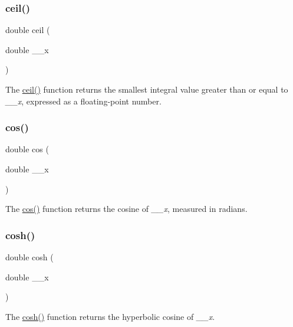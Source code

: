 \subsubsection{\texorpdfstring{ceil()}{ceil()}}
{\footnotesize\ttfamily double ceil (\begin{DoxyParamCaption}\item[{double}]{\+\_\+\+\_\+x }\end{DoxyParamCaption})}

The \hyperlink{group__avr__math_gaf3602dd198f88f5a571f62936fd6b5cc}{ceil()} function returns the smallest integral value greater than or equal to {\itshape \+\_\+\+\_\+x}, expressed as a floating-\/point number. \mbox{\label{group__avr__math_gaab93da039c516fcee9be6efb7d4cdfb3}} 
\subsubsection{\texorpdfstring{cos()}{cos()}}
{\footnotesize\ttfamily double cos (\begin{DoxyParamCaption}\item[{double}]{\+\_\+\+\_\+x }\end{DoxyParamCaption})}

The \hyperlink{group__avr__math_gaab93da039c516fcee9be6efb7d4cdfb3}{cos()} function returns the cosine of {\itshape \+\_\+\+\_\+x}, measured in radians. \mbox{\label{group__avr__math_ga9b61c968b8ce23a16b64b4e10cdb9970}} 
\subsubsection{\texorpdfstring{cosh()}{cosh()}}
{\footnotesize\ttfamily double cosh (\begin{DoxyParamCaption}\item[{double}]{\+\_\+\+\_\+x }\end{DoxyParamCaption})}

The \hyperlink{group__avr__math_ga9b61c968b8ce23a16b64b4e10cdb9970}{cosh()} function returns the hyperbolic cosine of {\itshape \+\_\+\+\_\+x}. \mbox{\label{group__avr__math_gab7e32d20a0c6089375c9a088e819d1fb}} 
